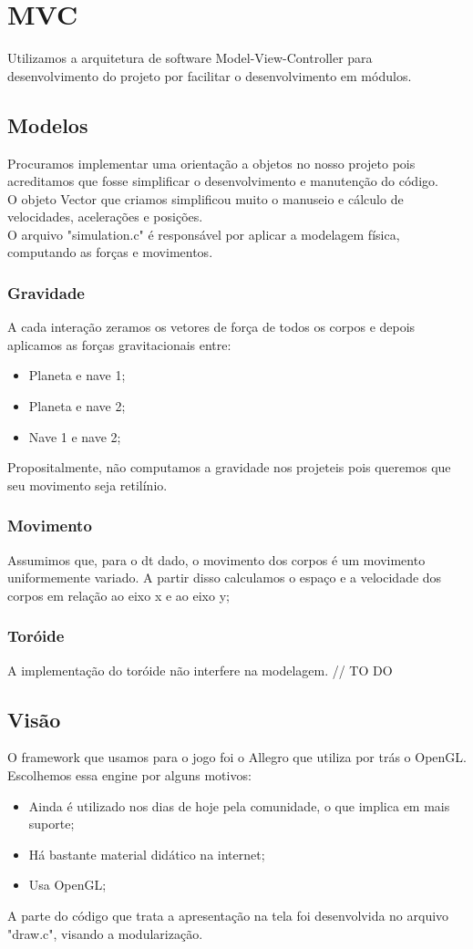 \documentclass{article}
\begin{document}
\section{MVC}
Utilizamos a arquitetura de software Model-View-Controller para desenvolvimento do projeto por facilitar o desenvolvimento em módulos.

\subsection{Modelos}
Procuramos implementar uma orientação a objetos no nosso projeto pois acreditamos que fosse simplificar o desenvolvimento e manutenção do
código. \\
O objeto Vector que criamos simplificou muito o manuseio e cálculo de velocidades, acelerações e posições. \\
O arquivo "simulation.c" é responsável por aplicar a modelagem física, computando as forças e movimentos.

\subsubsection{Gravidade}
A cada interação zeramos os vetores de força de todos os corpos e depois aplicamos as forças gravitacionais entre:
\begin{itemize}
\item Planeta e nave 1;
\item  Planeta e nave 2;
\item Nave 1 e nave 2;
\end{itemize}
Propositalmente, não computamos a gravidade nos projeteis pois queremos que seu movimento seja retilínio.

\subsubsection{Movimento}
Assumimos que, para o dt dado, o movimento dos corpos é um movimento uniformemente variado. A partir disso calculamos o espaço e a velocidade dos corpos em relação ao eixo x e ao eixo y;

\subsubsection{Toróide}
A implementação do toróide não interfere na modelagem. // TO DO

\subsection{Visão}
O framework que usamos para o jogo foi o Allegro que utiliza por trás o OpenGL. Escolhemos essa engine por alguns motivos: \\
\begin{itemize}
    \item Ainda é utilizado nos dias de hoje pela comunidade, o que implica em mais suporte;
    \item Há bastante material didático na internet;
    \item Usa OpenGL;
\end{itemize}
A parte do código que trata a apresentação na tela foi desenvolvida no arquivo "draw.c", visando a modularização.
\end{document}
